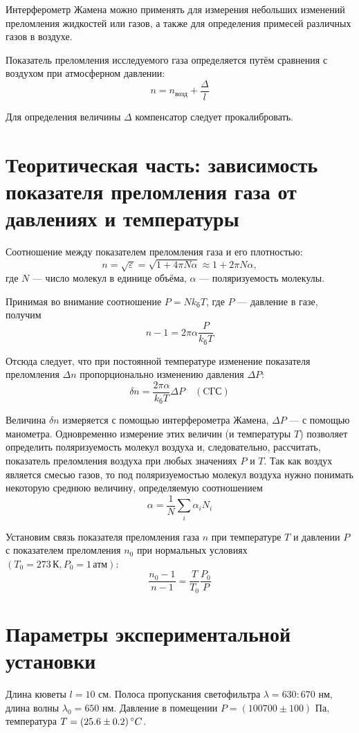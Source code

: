 \documentclass[12pt]{article}
\begin{document}
\par
	Интерферометр Жамена можно применять для измерения небольших изменений преломления жидкостей или газов, а также для определения примесей различных газов в воздухе.
\par
	Показатель преломления исследуемого газа определяется путём сравнения с воздухом при атмосферном давлении:
\[
		n = n_\text{возд} + \frac{\Delta}{l}
\]
\par
	Для определения величины $\Delta$ компенсатор следует прокалибровать.

\section*{Теоритическая часть: зависимость показателя преломления газа от давлениях и температуры}
\par
	Соотношение между показателем преломления газа и его плотностью:
\begin{equation}
	n = \sqrt{\varepsilon} = \sqrt{1 + 4 \pi N \alpha} \approx 1 + 2 \pi N \alpha,
\end{equation}
где $N$ --- число молекул в единице объёма, $\alpha$ --- поляризуемость молекулы.
\par
	Принимая во внимание соотношение $P = N k_\text{б} T$, где $P$ --- давление в газе,  получим
\[
	n - 1 = 2 \pi \alpha \frac{P}{k_\text{б} T}
\]
\par
	Отсюда следует, что при постоянной температуре изменение показателя преломления $\Delta n$ пропорционально изменению давления $\Delta P$:
\[
	\delta n = \frac{2 \pi \alpha}{k_\text{б} T} \Delta P \quad (\text{CГС})
\]
\par
	Величина $\delta n$ измеряется с помощью интерферометра Жамена, $\Delta P$ --- с помощью манометра. Одновременно измерение этих величин (и температуры $T$) позволяет определить поляризуемость молекул воздуха и, следовательно, рассчитать, показатель преломления воздуха при любых значениях $P$ и $T$. Так как воздух является смесью газов, то под поляризуемостью молекул воздуха нужно понимать некоторую среднюю величину, определяемую соотношением
\[
	\alpha = \frac{1}{N} \sum_i \alpha_i N_i
\]
\par
	Установим связь показателя преломления газа $n$ при температуре $T$ и давлении $P$ с показателем преломления $n_0$ при нормальных условиях $(T_0 = 273 \, \text{К}, P_0 = 1 \, \text{атм})$:
\[
	\frac{n_0 - 1}{n - 1} = \frac{T}{T_0} \frac{P_0}{P}
\]

\section*{Параметры экспериментальной установки}
\par
	Длина кюветы $l = 10$ см. Полоса пропускания светофильтра $\lambda = 630 : 670$ нм, длина волны $\lambda_0 = 650$ нм. Давление в помещении $P = (100700 \pm 100)$ Па, температура $T = (25.6 \pm 0.2) \, \degree C$.
\newpage
\end{document}

